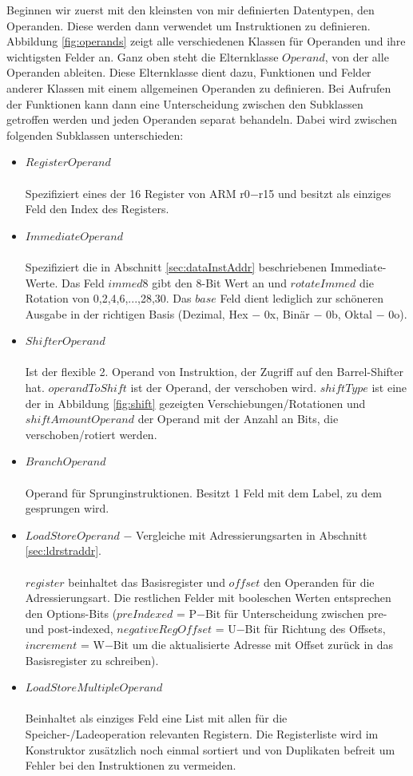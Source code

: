 \documentclass[a4paper, 11pt, onecolumn]{article}
\begin{document}
Beginnen wir zuerst mit den kleinsten von mir definierten Datentypen, den Operanden. Diese werden dann verwendet um Instruktionen zu definieren. Abbildung \ref{fig:operands} zeigt alle verschiedenen Klassen für Operanden und ihre wichtigsten Felder an. Ganz oben steht die Elternklasse $Operand$, von der alle Operanden ableiten. Diese Elternklasse dient dazu, Funktionen und Felder anderer Klassen mit einem allgemeinen Operanden zu definieren. Bei Aufrufen der Funktionen kann dann eine Unterscheidung zwischen den Subklassen getroffen werden und jeden Operanden separat behandeln. Dabei wird zwischen folgenden Subklassen unterschieden:

\begin{itemize}
\item $RegisterOperand$\\ \\Spezifiziert eines der 16 Register von ARM r0$-$r15 und besitzt als einziges Feld den Index des Registers.
\item $ImmediateOperand$\\ \\Spezifiziert die in Abschnitt \ref{sec:dataInstAddr} beschriebenen Immediate-Werte. Das Feld $immed8$ gibt den 8-Bit Wert an und $rotateImmed$ die Rotation von 0,2,4,6,...,28,30. Das $base$ Feld dient lediglich zur schöneren Ausgabe in der richtigen Basis (Dezimal, Hex $-$ 0x, Binär $-$ 0b, Oktal $-$ 0o).
\item $ShifterOperand$\\ \\Ist der flexible 2. Operand von Instruktion, der Zugriff auf den Barrel-Shifter hat. $operandToShift$ ist der Operand, der verschoben wird. $shiftType$ ist eine der in Abbildung \ref{fig:shift} gezeigten Verschiebungen/Rotationen und $shiftAmountOperand$ der Operand mit der Anzahl an Bits, die verschoben/rotiert werden.
\item $BranchOperand$\\ \\Operand für Sprunginstruktionen. Besitzt 1 Feld mit dem Label, zu dem gesprungen wird.
\item $LoadStoreOperand$ $-$ Vergleiche mit Adressierungsarten in Abschnitt \ref{sec:ldrstraddr}.\\ \\$register$ beinhaltet das Basisregister und $offset$ den Operanden für die Adressierungsart. Die restlichen Felder mit booleschen Werten entsprechen den Options-Bits ($preIndexed$ = P$-$Bit für Unterscheidung zwischen pre- und post-indexed, $negativeRegOffset$ = U$-$Bit für Richtung des Offsets, $increment$ = W$-$Bit um die aktualisierte Adresse mit Offset zurück in das Basisregister zu schreiben).
\item $LoadStoreMultipleOperand$\\ \\
Beinhaltet als einziges Feld eine List mit allen für die Speicher-/Ladeoperation relevanten Registern. Die Registerliste wird im Konstruktor zusätzlich noch einmal sortiert und von Duplikaten befreit um Fehler bei den Instruktionen zu vermeiden.
\end{itemize}
\end{document}

